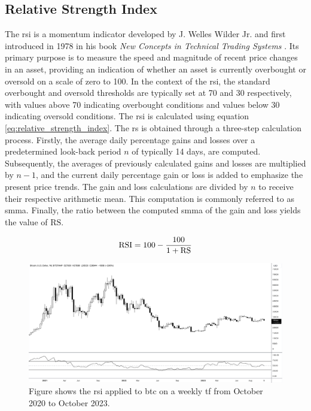 \subsection{Relative Strength Index}
\label{sub:RSI}
The \gls{rsi} is a momentum indicator developed by J. Welles Wilder Jr. and first introduced in 1978 in his book \textit{New Concepts in Technical Trading Systems} \citep{Wilder_1978}. Its primary purpose is to measure the speed and magnitude of recent price changes in an asset, providing an indication of whether an asset is currently overbought or oversold on a scale of zero to 100. In the context of the \gls{rsi}, the standard overbought and oversold thresholds are typically set at 70 and 30 respectively, with values above 70 indicating overbought conditions and values below 30 indicating oversold conditions.
\newline
\newline
The \gls{rsi} is calculated using equation \ref{eq:relative_strength_index}. The \gls{rs} is obtained through a three-step calculation process. Firstly, the average daily percentage gains and losses over a predetermined look-back period $n$ of typically 14 days, are computed. Subsequently, the averages of previously calculated gains and losses are multiplied by $n-1$, and the current daily percentage gain or loss is added to emphasize the present price trends. The gain and loss calculations are divided by $n$ to receive their respective arithmetic mean. This computation is commonly referred to as \gls{smma}. Finally, the ratio between the computed \gls{smma} of the gain and loss yields the value of $\text{RS}$.

\begin{equation}
    \centering
    \text{RSI} = 100 - \frac{100}{1 + \text{RS}}
    \label{eq:relative_strength_index}
\end{equation}

\begin{figure}[ht]
    \centering
    \includegraphics[width=\textwidth]{./assets/img/bitcoin_rsi.png}
    \caption{Figure shows the \gls{rsi} applied to \gls{btc} on a weekly \gls{tf} from October 2020 to October 2023.}
    \label{fig:relative_strength_index}
\end{figure}

